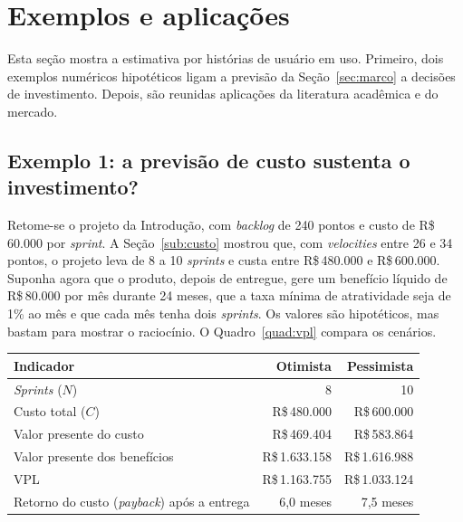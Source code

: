 
\section{Exemplos e aplicações}
\label{sec:exemplos}

Esta seção mostra a estimativa por histórias de usuário em uso. Primeiro, dois
exemplos numéricos hipotéticos ligam a previsão da Seção~\ref{sec:marco} a
decisões de investimento. Depois, são reunidas aplicações da literatura
acadêmica e do mercado.

\subsection{Exemplo 1: a previsão de custo sustenta o investimento?}
\label{sub:ex-investimento}

Retome-se o projeto da Introdução, com \textit{backlog} de 240 pontos e custo de
R\$\,60.000 por \textit{sprint}. A Seção~\ref{sub:custo} mostrou que, com
\textit{velocities} entre 26 e 34 pontos, o projeto leva de 8 a 10
\textit{sprints} e custa entre R\$\,480.000 e R\$\,600.000. Suponha agora que o
produto, depois de entregue, gere um benefício líquido de R\$\,80.000 por mês
durante 24 meses, que a taxa mínima de atratividade seja de 1\% ao mês e que
cada mês tenha dois \textit{sprints}. Os valores são hipotéticos, mas bastam para
mostrar o raciocínio. O Quadro~\ref{quad:vpl} compara os cenários.

\begin{quadro}[htbp]
  \caption{Valor presente líquido (VPL) do exemplo hipotético nos cenários otimista e pessimista}
  \label{quad:vpl}
  \small
  \begin{tabular}{@{}lrr@{}}
    \toprule
    \textbf{Indicador} & \textbf{Otimista} & \textbf{Pessimista} \\
    \midrule
    \textit{Sprints} ($N$)                              & 8              & 10 \\
    Custo total ($C$)                                   & R\$\,480.000   & R\$\,600.000 \\
    Valor presente do custo                             & R\$\,469.404   & R\$\,583.864 \\
    Valor presente dos benefícios                       & R\$\,1.633.158 & R\$\,1.616.988 \\
    VPL                                                 & R\$\,1.163.755 & R\$\,1.033.124 \\
    Retorno do custo (\textit{payback}) após a entrega  & 6,0 meses      & 7,5 meses \\
    \bottomrule
  \end{tabular}
  \par\vspace{1ex}
\end{quadro}

